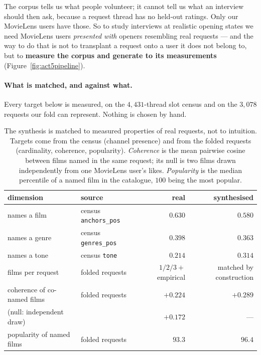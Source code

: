 \documentclass[11pt]{article}
\begin{document}
The corpus tells us what people volunteer; it cannot tell us what an interview should then ask,
because a request thread has no held-out ratings. Only our MovieLens users have those. So to study
interviews at realistic opening states we need MovieLens users \emph{presented with} openers resembling
real requests --- and the way to do that is not to transplant a request onto a user it does not
belong to, but to \textbf{measure the corpus and generate to its measurements}
(Figure~\ref{fig:act5pipeline}).

\paragraph{What is matched, and against what.} Every target below is measured, on the $4{,}431$-thread
slot census and on the $3{,}078$ requests our fold can represent. Nothing is chosen by hand.

\begin{table}[t]
\centering
\caption{The synthesis is matched to measured properties of real requests, not to intuition. Targets
come from the census (channel presence) and from the folded requests (cardinality, coherence,
popularity). \emph{Coherence} is the mean pairwise cosine between films named in the same request;
its null is two films drawn independently from one MovieLens user's likes. \emph{Popularity} is the
median percentile of a named film in the catalogue, $100$ being the most popular.}
\label{tab:opener_match}
\footnotesize
\begin{tabular}{llrr}
\toprule
dimension & source & real & synthesised \\
\midrule
names a film & census \texttt{anchors\_pos} & $0.630$ & $0.580$ \\
names a genre & census \texttt{genres\_pos} & $0.398$ & $0.363$ \\
names a tone & census \texttt{tone} & $0.214$ & $0.314$ \\
films per request & folded requests & $1/2/3{+}$ empirical & matched by construction \\
coherence of co-named films & folded requests & $+0.224$ & $+0.289$ \\
\quad (null: independent draw) & & $+0.172$ & --- \\
popularity of named films & folded requests & $93.3$ & $96.4$ \\
\bottomrule
\end{tabular}
\end{table}
\end{document}
